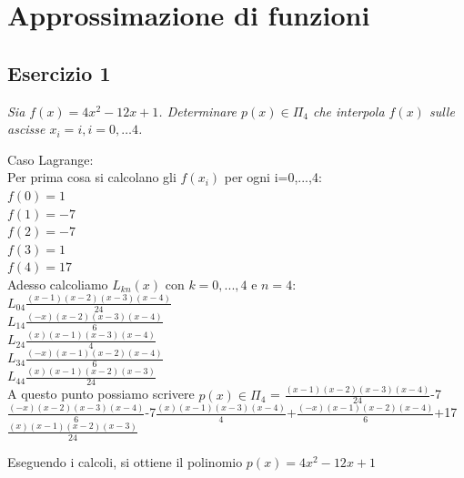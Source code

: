 \chapter{Approssimazione di funzioni}

\section{Esercizio 1}
\label{sub:Esercizio 1}
\emph{Sia $f(x) = 4x^{2} - 12x +1$. Determinare $p(x) \in \Pi_{4} $ che interpola $f(x)$ sulle ascisse $x_{i} = i, i = 0, \ldots 4$.}
\begin{sol}
	Caso Lagrange:\\
	Per prima cosa si calcolano gli $f(x_{i})$ per ogni i=0,...,4:\\
	$f(0)=1$\\
	$f(1)=-7$\\
	$f(2)=-7$\\
	$f(3)=1$\\
	$f(4)=17$\\
	Adesso calcoliamo $L_{kn}(x)$ con $k=0,...,4$ e $n=4$:\\
	$L_{04}\frac{(x-1)(x-2)(x-3)(x-4)}{24}$\\
	$L_{14}\frac{(-x)(x-2)(x-3)(x-4)}{6}$\\
	$L_{24}\frac{(x)(x-1)(x-3)(x-4)}{4}$\\
	$L_{34}\frac{(-x)(x-1)(x-2)(x-4)}{6}$\\
	$L_{44}\frac{(x)(x-1)(x-2)(x-3)}{24}$\\

	A questo punto possiamo scrivere $ p(x)\in\Pi_{4} $ = $\frac{(x-1)(x-2)(x-3)(x-4)}{24}$-7$\frac{(-x)(x-2)(x-3)(x-4)}{6}$-7$\frac{(x)(x-1)(x-3)(x-4)}{4}$+$\frac{(-x)(x-1)(x-2)(x-4)}{6}$+17$\frac{(x)(x-1)(x-2)(x-3)}{24}$

	\vspace{2mm}
	Eseguendo i calcoli, si ottiene il polinomio $p(x)=4x^{2}-12x+1$
\end{sol}



